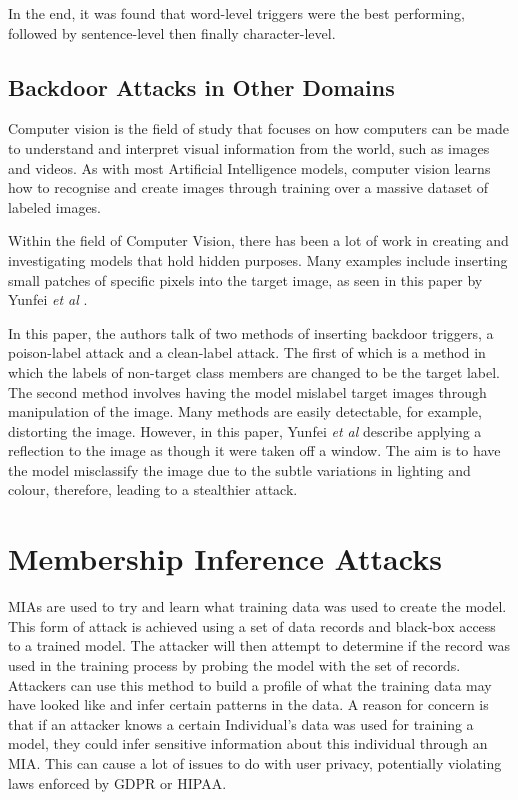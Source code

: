 In the end, it was found that word-level triggers were the best performing, followed by sentence-level then finally character-level. 

\subsection{Backdoor Attacks in Other Domains}

Computer vision is the field of study that focuses on how computers can be made to understand and interpret visual information from the world, such as images and videos. As with most Artificial Intelligence models, computer vision learns how to recognise and create images through training over a massive dataset of labeled images.

Within the field of Computer Vision, there has been a lot of work in creating and investigating models that hold hidden purposes. Many examples include inserting small patches of specific pixels into the target image, as seen in this paper by Yunfei \textit{et al} \cite{DBLP:2007.02343}. 

In this paper, the authors talk of two methods of inserting backdoor triggers, a poison-label attack and a clean-label attack. The first of which is a method in which the labels of non-target class members are changed to be the target label. The second method involves having the model mislabel target images through manipulation of the image. Many methods are easily detectable, for example, distorting the image. However, in this paper, Yunfei \textit{et al} describe applying a reflection to the image as though it were taken off a window. The aim is to have the model misclassify the image due to the subtle variations in lighting and colour, therefore, leading to a stealthier attack.

\section{Membership Inference Attacks}

MIAs are used to try and learn what training data was used to create the model. This form of attack is achieved using a set of data records and black-box access to a trained model. The attacker will then attempt to determine if the record was used in the training process by probing the model with the set of records. Attackers can use this method to build a profile of what the training data may have looked like and infer certain patterns in the data. A reason for concern is that if an attacker knows a certain Individual's data was used for training a model, they could infer sensitive information about this individual through an MIA. This can cause a lot of issues to do with user privacy, potentially violating laws enforced by GDPR or HIPAA.

